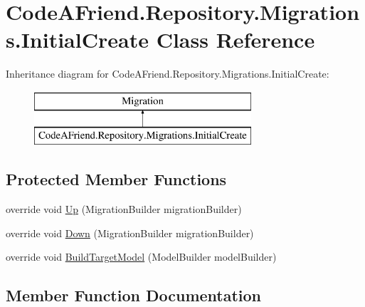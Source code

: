 \hypertarget{class_code_a_friend_1_1_repository_1_1_migrations_1_1_initial_create}{}\section{Code\+A\+Friend.\+Repository.\+Migrations.\+Initial\+Create Class Reference}
\label{class_code_a_friend_1_1_repository_1_1_migrations_1_1_initial_create}
Inheritance diagram for Code\+A\+Friend.\+Repository.\+Migrations.\+Initial\+Create\+:\begin{figure}[H]
\begin{center}
\leavevmode
\includegraphics[height=2.000000cm]{class_code_a_friend_1_1_repository_1_1_migrations_1_1_initial_create}
\end{center}
\end{figure}
\subsection*{Protected Member Functions}
\begin{DoxyCompactItemize}
\item 
override void \mbox{\hyperlink{class_code_a_friend_1_1_repository_1_1_migrations_1_1_initial_create_a74096fd245fe8053636da0e6b42555f5}{Up}} (Migration\+Builder migration\+Builder)
\item 
override void \mbox{\hyperlink{class_code_a_friend_1_1_repository_1_1_migrations_1_1_initial_create_a990a4291d83d80015cb2f085f32d3e2a}{Down}} (Migration\+Builder migration\+Builder)
\item 
override void \mbox{\hyperlink{class_code_a_friend_1_1_repository_1_1_migrations_1_1_initial_create_af61ca20b8cd6530bcd97d1d9d238cac2}{Build\+Target\+Model}} (Model\+Builder model\+Builder)
\end{DoxyCompactItemize}


\subsection{Member Function Documentation}
\mbox{\label{class_code_a_friend_1_1_repository_1_1_migrations_1_1_initial_create_af61ca20b8cd6530bcd97d1d9d238cac2}} 
